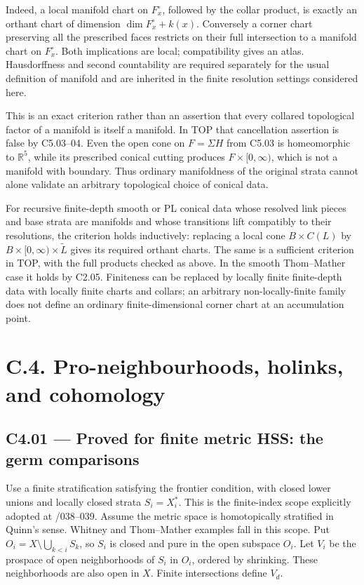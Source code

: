 Indeed, a local manifold chart on \(F_x^\circ\), followed by the collar product, is exactly an orthant chart of dimension \(\dim F_x^\circ+k(x)\). Conversely a corner chart preserving all the prescribed faces restricts on their full intersection to a manifold chart on \(F_x^\circ\). Both implications are local; compatibility gives an atlas. Hausdorffness and second countability are required separately for the usual definition of manifold and are inherited in the finite resolution settings considered here.

This is an exact criterion rather than an assertion that every collared topological factor of a manifold is itself a manifold. In TOP that cancellation assertion is false by C5.03--04. Even the open cone on \(F=\Sigma H\) from C5.03 is homeomorphic to \(\mathbb R^5\), while its prescribed conical cutting produces \(F\times[0,\infty)\), which is not a manifold with boundary. Thus ordinary manifoldness of the original strata cannot alone validate an arbitrary topological choice of conical data.

For recursive finite-depth smooth or PL conical data whose resolved link pieces and base strata are manifolds and whose transitions lift compatibly to their resolutions, the criterion holds inductively: replacing a local cone \(B\times C(L)\) by \(B\times[0,\infty)\times\widetilde L\) gives its required orthant charts. The same is a sufficient criterion in TOP, with the full products checked as above. In the smooth Thom--Mather case it holds by C2.05. Finiteness can be replaced by locally finite finite-depth data with locally finite charts and collars; an arbitrary non-locally-finite family does not define an ordinary finite-dimensional corner chart at an accumulation point.

\section{C.4. Pro-neighbourhoods, holinks, and cohomology}\label{c.4.-pro-neighbourhoods-holinks-and-cohomology}

\subsection{C4.01 --- Proved for finite metric HSS: the germ comparisons}\label{c4.01-proved-for-finite-metric-hss-the-germ-comparisons}

Use a finite stratification satisfying the frontier condition, with closed lower unions and locally closed strata \(S_i=X_i^*\). This is the finite-index scope explicitly adopted at /038--039. Assume the metric space is homotopically stratified in Quinn's sense. Whitney and Thom--Mather examples fall in this scope. Put \(O_i=X\setminus\bigcup_{k<i}S_k\), so \(S_i\) is closed and pure in the open subspace \(O_i\). Let \(V_i\) be the prospace of open neighborhoods of \(S_i\) in \(O_i\), ordered by shrinking. These neighborhoods are also open in \(X\). Finite intersections define \(V_d\).

